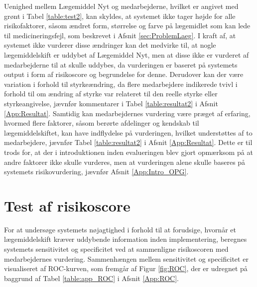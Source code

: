 Uenighed mellem Lægemiddel Nyt og medarbejderne, hvilket er angivet med grønt i Tabel \ref{table:test2}, kan skyldes, at systemet ikke tager højde for alle risikofaktorer, såsom ændret form, størrelse og farve på lægemidlet som kan lede til medicineringsfejl, som beskrevet i Afsnit \ref{sec:ProblemLaeg}. I kraft af, at systemet ikke vurderer disse ændringer kan det medvirke til, at nogle lægemiddelskift er uddybet af Lægemiddel Nyt, men at disse ikke er vurderet af medarbejderne til at skulle uddybes, da vurderingen er baseret på systemets output i form af risikoscore og begrundelse for denne. Derudover kan der være variation i forhold til styrkeændring, da flere medarbejdere indikerede tvivl i forhold til om ændring af styrke var relateret til den reelle styrke eller styrkeangivelse, jævnfør kommentarer i Tabel \ref{table:resultat2} i Afsnit \ref{App:Resultat}. Samtidig kan medarbejdernes vurdering være præget af erfaring, hvormed flere faktorer, såsom berørte afdelinger og kendskab til lægemiddelskiftet, kan have indflydelse på vurderingen, hvilket understøttes af to medarbejdere, jævnfør Tabel \ref{table:resultat2} i Afsnit \ref{App:Resultat}. Dette er til trods for, at der i introduktionen inden evalueringen blev gjort opmærksom på at andre faktorer ikke skulle vurderes, men at vurderingen alene skulle baseres på systemets risikovurdering, jævnfør Afsnit \ref{App:Intro_OPG}. 

\section{Test af risikoscore}
For at undersøge systemets nøjagtighed i forhold til at forudsige, hvornår et lægemiddelskift kræver uddybende information inden implementering, beregnes systemets sensitivitet og specificitet ved at sammenligne risikoscoren med medarbejdernes vurdering. Sammenhængen mellem sensitivitet og specificitet er visualiseret af ROC-kurven, som fremgår af Figur \ref{fig:ROC}, der er udregnet på baggrund af Tabel \ref{table:app_ROC} i Afsnit \ref{App:ROC}. 

